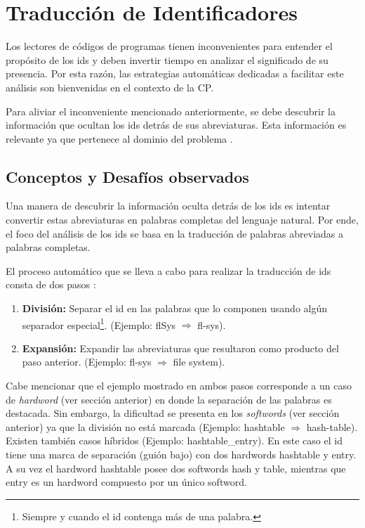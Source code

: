 \documentclass[a4paper,12pt]{report}
\begin{document}
\section{Traducción de Identificadores}

Los lectores de códigos de programas tienen inconvenientes para entender el propósito de los ids y deben invertir tiempo en analizar el significado de su presencia. Por esta razón, las estrategias automáticas dedicadas a facilitar este análisis son bienvenidas en el contexto de la CP.

Para aliviar el inconveniente mencionado anteriormente, se debe descubrir la información que ocultan los ids detrás de sus abreviaturas. Esta información es relevante ya que pertenece al dominio del problema \cite{EHPV09,LFBEX07}. 

\subsection{Conceptos y Desafíos observados}

Una manera de descubrir la información oculta detrás de los ids es intentar convertir estas abreviaturas en palabras completas del lenguaje natural. Por ende, el foco del análisis de los ids se basa en la traducción de palabras abreviadas a palabras completas.

El proceso automático que se lleva a cabo para realizar la traducción de ids consta de dos pasos \cite{LFBEX07}:

\begin{enumerate}
\itemsep0em%
\item \textbf{División:} Separar el id en las palabras que lo componen usando algún separador especial\footnote[1]{Siempre y cuando el id contenga más de una palabra.}. (Ejemplo: \textsf{flSys} $\Rightarrow$ \textsf{fl-sys}).

\item \textbf{Expansión:} Expandir las abreviaturas que resultaron como producto del paso anterior. (Ejemplo: \textsf{fl-sys} $\Rightarrow$ \textsf{file system}).
\end{enumerate}

Cabe mencionar que el ejemplo mostrado en ambos pasos corresponde a un caso de \textit{hardword} (ver sección anterior) en donde la separación de las palabras es destacada. Sin embargo, la dificultad se presenta en los \textit{softwords} (ver sección anterior) ya que la división no está marcada (Ejemplo: \textsf{hashtable} $\Rightarrow$ \textsf{hash-table}). Existen también casos híbridos (Ejemplo: \textsf{hashtable\_entry}). En este caso el id tiene una marca de separación (guión bajo) con dos hardwords \textsf{hashtable} y \textsf{entry}. A su vez el hardword \textsf{hashtable} posee dos softwords \textsf{hash} y \textsf{table}, mientras que \textsf{entry} es un hardword compuesto por un único softword. 
\end{document}
